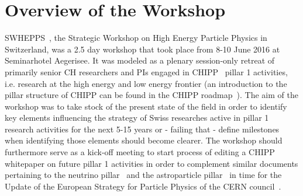\section{Overview of the Workshop}\label{Overview}



\noindent SWHEPPS~\cite{workshopindico},  the Strategic Workshop on High Energy Particle Physics in Switzerland, was a 2.5 day workshop that took place from 8-10 June 2016 at 
Seminarhotel Aegerisee.   It was  modeled as a plenary session-only retreat of primarily senior CH researchers and PIs engaged in CHIPP~\cite{chipp} pillar 1 activities, 
i.e. research at the high energy and low energy frontier (an introduction to the pillar structure of CHIPP can be found in the CHIPP roadmap~\cite{roadmap}). The aim  of the workshop
 was to take stock of the present state of the field in order to identify key elements influencing the strategy of Swiss researches active in pillar 1 research activities for the next 5-15 years or
 - failing that - define milestones when identifying those elements should become clearer. The workshop should furthermore serve as a kick-off meeting to start  process of editing a
 CHIPP whitepaper on future pillar 1 activities in order to  complement similar documents pertaining to the neutrino pillar~\cite{neutrinowhitepaper} and the astroparticle 
  pillar~\cite{astroparticlepillarwhitepaper} in time for the Update of the European Strategy for Particle Physics  of the  CERN council~\cite{europeanstrategy}. 



 


 


 


 

